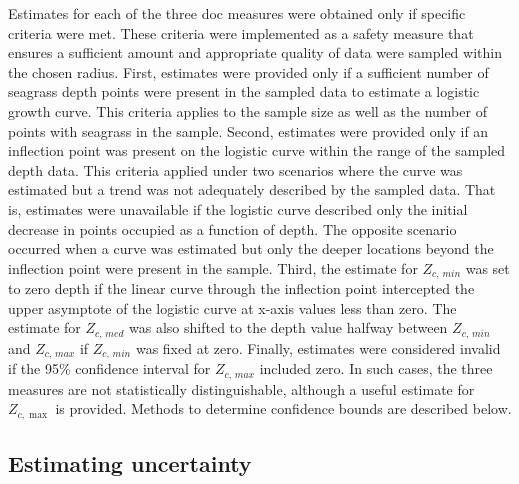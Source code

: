 \documentclass[letterpaper,12pt,oneside]{article}\usepackage[]{graphicx}\usepackage[]{color}
\begin{document}
Estimates for each of the three \ac{doc} measures were obtained only if specific criteria were met.  These criteria were implemented as a safety measure that ensures a sufficient amount and appropriate quality of data were sampled within the chosen radius.  First, estimates were provided only if a sufficient number of seagrass depth points were present in the sampled data to estimate a logistic growth curve.  This criteria applies to the sample size as well as the number of points with seagrass in the sample.  Second, estimates were provided only if an inflection point was present on the logistic curve within the range of the sampled depth data.  This criteria applied under two scenarios where the curve was estimated but a trend was not adequately described by the sampled data.  That is, estimates were unavailable if the logistic curve described only the initial decrease in points occupied as a function of depth.  The opposite scenario occurred when a curve was estimated but only the deeper locations beyond the inflection point were present in the sample.  Third, the estimate for $Z_{c,\,min}$ was set to zero depth if the linear curve through the inflection point intercepted the upper asymptote of the logistic curve at x-axis values less than zero.  The estimate for $Z_{c,\,med}$ was also shifted to the depth value halfway between $Z_{c,\,min}$ and $Z_{c,\,max}$ if $Z_{c,\,min}$ was fixed at zero.  Finally, estimates were considered invalid if the 95\% confidence interval for $Z_{c,\,max}$ included zero.  In such cases, the three measures are not statistically distinguishable, although a useful estimate for $Z_{c,\max}$ is provided.  Methods to determine confidence bounds are described below.  

\subsection{Estimating uncertainty}
\end{document}
